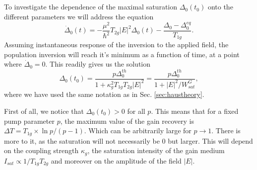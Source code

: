 \documentclass[preprint,secnumarabic,amssymb, nobibnotes, aip, prd]{revtex4-1}
\begin{document}
\subsection{}
To investigate the dependence of the maximal saturation $\Delta_0(t_0)$ onto the different parameters we will address the equation
\begin{equation}
\label{eq:inversion3}
\dot\Delta_0(t) = -\frac{\mu^2}{\hbar^2}T_{2g} |E|^2\Delta_0(t) -\frac{\Delta_0-\Delta_0^{eq}}{T_{1g}}.
\end{equation}
Assuming instantaneous response of the inversion to the applied field, the population inversion will reach it's minimum as a function of time, at a point where $\dot\Delta_0 = 0$. This readily gives us the solution
\begin{equation}
\label{eq:saturation}
\Delta_0(t_0) =  \frac{ p\Delta_0^{th}}{1+\kappa_g^2T_{1g}T_{2g}|E|^2} = \frac{ p\Delta_0^{th}}{1+|E|^2/W_{sat}^G} ,
\end{equation} 
where we have used the same notation as in Sec. \ref{sec:haustheory}.


First of all, we notice that $\Delta_0(t_0) >0$ for all $p$. This means that for a fixed pump parameter $p$, the maximum value of the gain recovery is $\Delta T= T_{1g}\times\ln p/(p-1)$. Which can be arbitrarily large for $p\to 1$. There is more to it, as the saturation will not necessarily be 0 but larger. This will depend on the coupling strength $\kappa_g$, the saturation intensity of the gain medium $I_{sat}\propto 1/T_{1g}T_{2g}$ and moreover on the amplitude of the field $|E|$.
\end{document}

